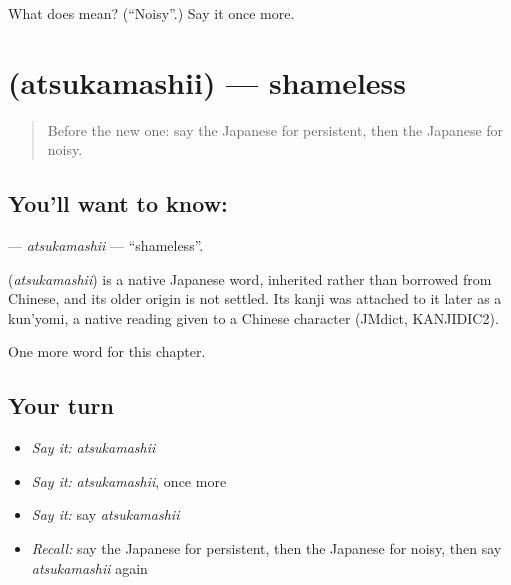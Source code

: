\begin{tcolorbox}[breakable,colback=teal!4,colframe=teal!35!black,title={Before you move on}]
What does  mean? (\textquotedblleft{}Noisy\textquotedblright{}.) Say it once more.
\end{tcolorbox}
\section[\texorpdfstring{\ja{あつかましい} (atsukamashii)}{あつかましい (atsukamashii)}]{ (atsukamashii) — shameless}

\label{lesson:JA-C129-atsukamashii}



\begin{quote}
Before the new one: say the Japanese for persistent, then the Japanese for noisy.
\end{quote}

\subsection*{You'll want to know: }
\textbf{} — \emph{atsukamashii} — \textquotedblleft{}shameless\textquotedblright{}.

\begin{cousinweb}
\textbf{} (\emph{atsukamashii}) is a native Japanese word, inherited rather than borrowed from Chinese, and its older origin is not settled. Its kanji was attached to it later as a kun'yomi, a native reading given to a Chinese character (JMdict, KANJIDIC2).
\end{cousinweb}

\begin{grammarlens}[title={What you've built}]
One more word for this chapter.
\end{grammarlens}

\subsection*{Your turn}
\begin{itemize}
\raggedright
  \item \emph{Say it:} \emph{atsukamashii}
  \item \emph{Say it:} \emph{atsukamashii}, once more
  \item \emph{Say it:} say \emph{atsukamashii}
  \item \emph{Recall:} say the Japanese for persistent, then the Japanese for noisy, then say \emph{atsukamashii} again
\end{itemize}

